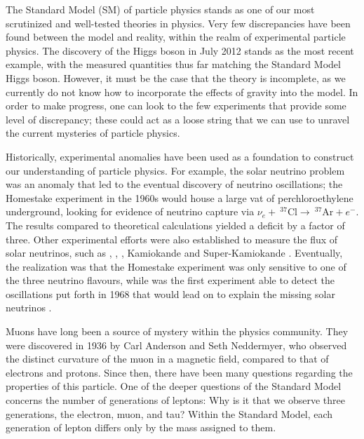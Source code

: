 \label{chapter:introduction}

The Standard Model (SM) of particle physics stands as one of our most scrutinized and well-tested theories in physics.
Very few discrepancies have been found between the model and reality, within the realm of experimental particle physics.
The discovery of the Higgs boson in July 2012 stands as the most recent example, with the measured quantities thus far matching the Standard Model Higgs boson.
However, it must be the case that the theory is incomplete, as we currently do not know how to incorporate the effects of gravity into the model.
In order to make progress, one can look to the few experiments that provide some level of discrepancy; these could act as a loose string that we can use to unravel the current mysteries of particle physics.

Historically, experimental anomalies have been used as a foundation to construct our understanding of particle physics.
For example, the solar neutrino problem was an anomaly that led to the eventual discovery of neutrino oscillations; the Homestake experiment \cite{Davis:1968cp} in the 1960s would house a large vat of perchloroethylene underground, looking for evidence of neutrino capture via $\nu_e +~^{37}\textrm{Cl} \rightarrow~^{37}\textrm{Ar} + e^-$.
The results compared to theoretical calculations yielded a deficit by a factor of three.
Other experimental efforts were also established to measure the flux of solar neutrinos, such as \sage \cite{Abdurashitov:1999zd}, \gallex \cite{Hampel:1998xg}, \sno \cite{Boger:1999bb}, Kamiokande and Super-Kamiokande \cite{Fukuda:1996sz, Fukuda:2002pe}.
Eventually, the realization was that the Homestake experiment was only sensitive to one of the three neutrino flavours, while \sno was the first experiment able to detect the oscillations put forth in 1968 that would lead on to explain the missing solar neutrinos \cite{Gribov:1968kq}.

Muons have long been a source of mystery within the physics community.
They were discovered in 1936 by Carl Anderson and Seth Neddermyer, who observed the distinct curvature of the muon in a magnetic field, compared to that of electrons and protons. Since then, there have been many questions regarding the properties of this particle.
One of the deeper questions of the Standard Model concerns the number of generations of leptons: Why is it that we observe three generations, the electron, muon, and tau? Within the Standard Model, each generation of lepton differs only by the mass assigned to them.

